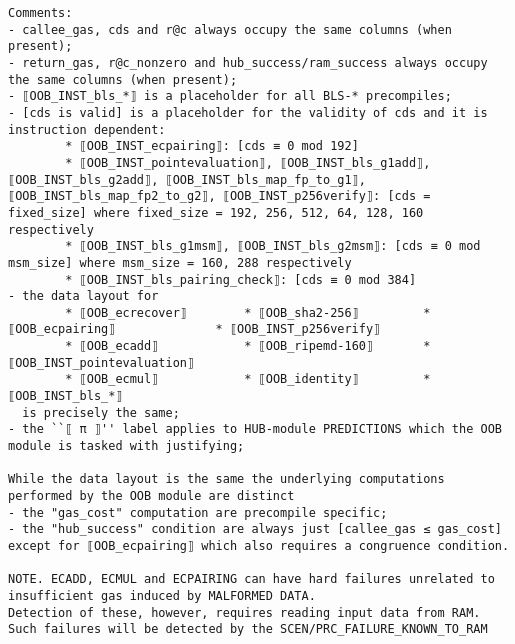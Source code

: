 \documentclass[varwidth=\maxdimen,margin=0.5cm,multi={verbatim}]{standalone}
\begin{document}
\begin{verbatim}
Comments: 
- callee_gas, cds and r@c always occupy the same columns (when present);
- return_gas, r@c_nonzero and hub_success/ram_success always occupy the same columns (when present);
- ⟦OOB_INST_bls_*⟧ is a placeholder for all BLS-* precompiles;
- [cds is valid] is a placeholder for the validity of cds and it is instruction dependent:
        * ⟦OOB_INST_ecpairing⟧: [cds ≡ 0 mod 192]
        * ⟦OOB_INST_pointevaluation⟧, ⟦OOB_INST_bls_g1add⟧, ⟦OOB_INST_bls_g2add⟧, ⟦OOB_INST_bls_map_fp_to_g1⟧, ⟦OOB_INST_bls_map_fp2_to_g2⟧, ⟦OOB_INST_p256verify⟧: [cds = fixed_size] where fixed_size = 192, 256, 512, 64, 128, 160 respectively  
        * ⟦OOB_INST_bls_g1msm⟧, ⟦OOB_INST_bls_g2msm⟧: [cds ≡ 0 mod msm_size] where msm_size = 160, 288 respectively
        * ⟦OOB_INST_bls_pairing_check⟧: [cds ≡ 0 mod 384]
- the data layout for
        * ⟦OOB_ecrecover⟧        * ⟦OOB_sha2-256⟧         * ⟦OOB_ecpairing⟧              * ⟦OOB_INST_p256verify⟧ 
        * ⟦OOB_ecadd⟧            * ⟦OOB_ripemd-160⟧       * ⟦OOB_INST_pointevaluation⟧           
        * ⟦OOB_ecmul⟧            * ⟦OOB_identity⟧         * ⟦OOB_INST_bls_*⟧
  is precisely the same;
- the ``⟦ π ⟧'' label applies to HUB-module PREDICTIONS which the OOB module is tasked with justifying;

While the data layout is the same the underlying computations performed by the OOB module are distinct
- the "gas_cost" computation are precompile specific;
- the "hub_success" condition are always just [callee_gas ≤ gas_cost] except for ⟦OOB_ecpairing⟧ which also requires a congruence condition.

NOTE. ECADD, ECMUL and ECPAIRING can have hard failures unrelated to insufficient gas induced by MALFORMED DATA.
Detection of these, however, requires reading input data from RAM. Such failures will be detected by the SCEN/PRC_FAILURE_KNOWN_TO_RAM 
\end{verbatim}
\end{document}
